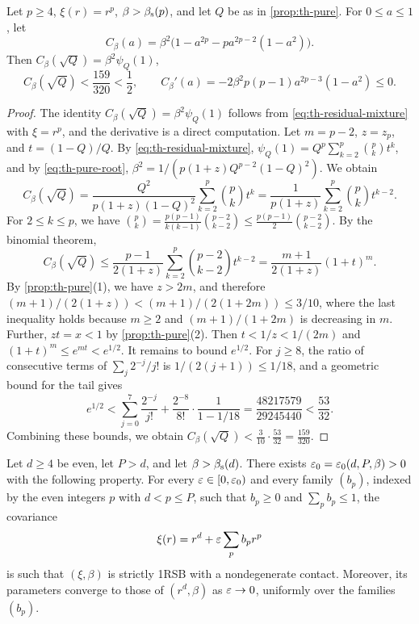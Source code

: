 \begin{lemma}\label{lem:th-pure-residual}
Let $p\ge4$, $\xi(r)=r^p$, $\beta>\beta_{\mathrm s}(p)$, and let $Q$ be as in \cref{prop:th-pure}. For $0\le a\le1$, let
\[
C_\beta(a)=\beta^2\big(1-a^{2p}-pa^{2p-2}(1-a^2)\big).
\]
Then $C_\beta(\sqrt Q)=\beta^2\psi_Q(1)$,
\begin{equation}\label{eq:th-pure-residual}
C_\beta(\sqrt Q)<\frac{159}{320}<\frac12,\qquad C_\beta'(a)=-2\beta^2p(p-1)a^{2p-3}(1-a^2)\le0.
\end{equation}
\end{lemma}

\begin{proof}
The identity $C_\beta(\sqrt Q)=\beta^2\psi_Q(1)$ follows from \eqref{eq:th-residual-mixture} with $\xi=r^p$, and the derivative is a direct computation. Let $m=p-2$, $z=z_p$, and $t=(1-Q)/Q$. By \eqref{eq:th-residual-mixture}, $\psi_Q(1)=Q^p\sum_{k=2}^p\binom pkt^k$, and by \eqref{eq:th-pure-root}, $\beta^2=1/(p(1+z)Q^{p-2}(1-Q)^2)$. We obtain
\[
C_\beta(\sqrt Q)=\frac{Q^2}{p(1+z)(1-Q)^2}\sum_{k=2}^p\binom pkt^k=\frac1{p(1+z)}\sum_{k=2}^p\binom pkt^{k-2}.
\]
For $2\le k\le p$, we have $\binom pk=\frac{p(p-1)}{k(k-1)}\binom{p-2}{k-2}\le\frac{p(p-1)}2\binom{p-2}{k-2}$. By the binomial theorem,
\[
C_\beta(\sqrt Q)\le\frac{p-1}{2(1+z)}\sum_{k=2}^p\binom{p-2}{k-2}t^{k-2}=\frac{m+1}{2(1+z)}(1+t)^m.
\]
By \cref{prop:th-pure}(1), we have $z>2m$, and therefore $(m+1)/(2(1+z))<(m+1)/(2(1+2m))\le3/10$, where the last inequality holds because $m\ge2$ and $(m+1)/(1+2m)$ is decreasing in $m$. Further, $zt=x<1$ by \cref{prop:th-pure}(2). Then $t<1/z<1/(2m)$ and $(1+t)^m\le e^{mt}<e^{1/2}$. It remains to bound $e^{1/2}$. For $j\ge8$, the ratio of consecutive terms of $\sum_j2^{-j}/j!$ is $1/(2(j+1))\le1/18$, and a geometric bound for the tail gives
\[
e^{1/2}<\sum_{j=0}^7\frac{2^{-j}}{j!}+\frac{2^{-8}}{8!}\cdot\frac1{1-1/18}=\frac{48217579}{29245440}<\frac{53}{32}.
\]
Combining these bounds, we obtain $C_\beta(\sqrt Q)<\frac3{10}\cdot\frac{53}{32}=\frac{159}{320}$.
\end{proof}

\begin{proposition}\label{prop:th-perturbative}
Let $d\ge4$ be even, let $P>d$, and let $\beta>\beta_{\mathrm s}(d)$. There exists $\varepsilon_0=\varepsilon_0(d,P,\beta)>0$ with the following property. For every $\varepsilon\in[0,\varepsilon_0)$ and every family $(b_p)$, indexed by the even integers $p$ with $d<p\le P$, such that $b_p\ge0$ and $\sum_pb_p\le1$, the covariance
\[
\xi(r)=r^d+\varepsilon\sum_pb_pr^p
\]
is such that $(\xi,\beta)$ is strictly 1RSB with a nondegenerate contact. Moreover, its parameters converge to those of $(r^d,\beta)$ as $\varepsilon\to0$, uniformly over the families $(b_p)$.
\end{proposition}


